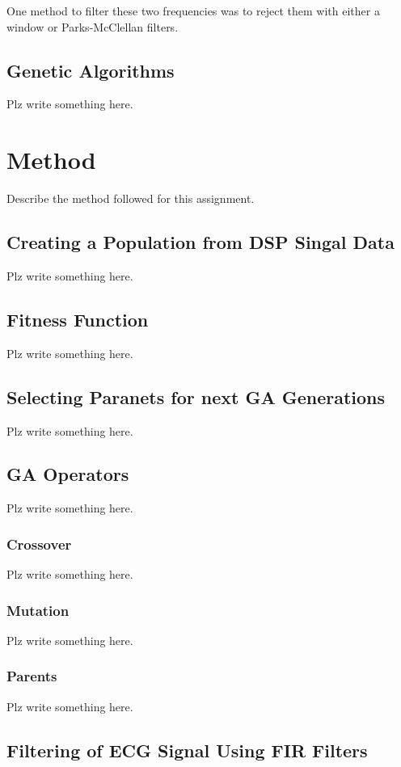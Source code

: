 \documentclass[a4paper, 11pt]{article}
\begin{document}
        One method to filter these two frequencies was to reject them with either a window or Parks-McClellan filters.
        
    \subsection{Genetic Algorithms}\label{sec:bg_sub2}
        Plz write something here.

\section{Method}\label{sec:meth}
    Describe the method followed for this assignment.
    \subsection{Creating a Population from DSP Singal Data}\label{sec:meth_sub1}
        Plz write something here.
    \subsection{Fitness Function}\label{sec:meth_sub2}
        Plz write something here.
    \subsection{Selecting Paranets for next GA Generations}\label{sec:meth_sub3}
        Plz write something here.
    \subsection{GA Operators}\label{sec:meth_sub4}
        Plz write something here.
        \subsubsection{Crossover}
            Plz write something here.
        \subsubsection{Mutation}
            Plz write something here.
        \subsubsection{Parents}
            Plz write something here.
    \subsection{Filtering of ECG Signal Using FIR Filters}\label{sec:meth_sub5}
\end{document}
